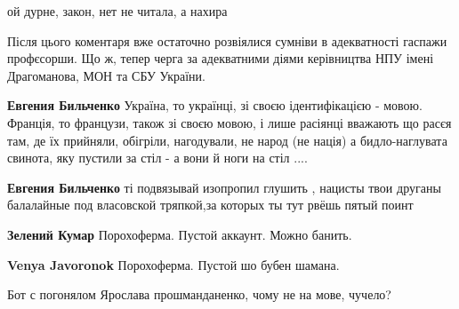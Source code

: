 \begin{itemize}
\begin{itemize}
ой дурне, закон, нет не читала, а нахира 🤣🤣🤣

 
Після цього коментаря вже остаточно розвіялися сумніви в адекватності гаспажи профєсорши. Що ж, тепер черга за адекватними діями керівництва НПУ імені Драгоманова, МОН та СБУ України.

 
\textbf{Евгения Бильченко} Україна, то українці, зі своєю ідентифікацією - мовою. Франція, то французи, також зі своєю мовою, і лише расіянці вважають що расєя там, де їх прийняли, обігріли, нагодували, не народ (не нація) а бидло-наглувата свинота, яку пустили за стіл - а вони й ноги на стіл ....🤮

 
\textbf{Евгения Бильченко} ті подвязывай изопропил глушить , нацисты твои друганы балалайные под власовской тряпкой,за которых ты тут рвёшь пятый поинт

 
\textbf{Зелений Кумар} Порохоферма. Пустой аккаунт. Можно банить.

 
\textbf{Venya Javoronok} Порохоферма. Пустой шо бубен шамана.

 
Бот с погонялом Ярослава прошманданенко, чому не на мове, чучело?

 

\end{itemize}
\end{itemize}
